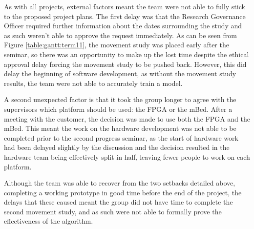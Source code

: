 As with all projects, external factors meant the team were not able to fully stick to the proposed project plans. The first delay was that the Research Governance Officer required further information about the dates surrounding the study and as such weren't able to approve the request immediately. As can be seen from Figure \ref{table:gantt:term11}, the movement study was placed early after the seminar, so there was an opportunity to make up the lost time despite the ethical approval delay forcing the movement study to be pushed back. However, this did delay the beginning of software development, as without the movement study results, the team were not able to accurately train a model.

A second unexpected factor is that it took the group longer to agree with the supervisors which platform should be used: the FPGA or the mBed. After a meeting with the customer, the decision was made to use both the FPGA and the mBed. This meant the work on the hardware development was not able to be completed prior to the second progress seminar, as the start of hardware work had been delayed slightly by the discussion and the decision resulted in the hardware team being effectively split in half, leaving fewer people to work on each platform.

Although the team was able to recover from the two setbacks detailed above, completing a working prototype in good time before the end of the project, the delays that these caused meant the group did not have time to complete the second movement study, and as such were not able to formally prove the effectiveness of the algorithm.
